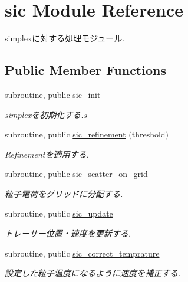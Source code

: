 \hypertarget{classsic}{\section{sic Module Reference}
\label{classsic}
}


simplexに対する処理モジュール.  


\subsection*{Public Member Functions}
\begin{DoxyCompactItemize}
\item 
\hypertarget{classsic_af76384b2a57a47d7b02f3574a5b1a2b9}{subroutine, public \hyperlink{classsic_af76384b2a57a47d7b02f3574a5b1a2b9}{sic\-\_\-init}}\label{classsic_af76384b2a57a47d7b02f3574a5b1a2b9}

\begin{DoxyCompactList}\small\item\em simplexを初期化する.\-s \end{DoxyCompactList}\item 
subroutine, public \hyperlink{classsic_afdb4c8e975017da107618e892a08d2b2}{sic\-\_\-refinement} (threshold)
\begin{DoxyCompactList}\small\item\em Refinementを適用する. \end{DoxyCompactList}\item 
\hypertarget{classsic_a2543398f0de764a44514acd6e4a0a93c}{subroutine, public \hyperlink{classsic_a2543398f0de764a44514acd6e4a0a93c}{sic\-\_\-scatter\-\_\-on\-\_\-grid}}\label{classsic_a2543398f0de764a44514acd6e4a0a93c}

\begin{DoxyCompactList}\small\item\em 粒子電荷をグリッドに分配する. \end{DoxyCompactList}\item 
\hypertarget{classsic_a81b2a4e731ae8e7b6f56d89a0be4c910}{subroutine, public \hyperlink{classsic_a81b2a4e731ae8e7b6f56d89a0be4c910}{sic\-\_\-update}}\label{classsic_a81b2a4e731ae8e7b6f56d89a0be4c910}

\begin{DoxyCompactList}\small\item\em トレーサー位置・速度を更新する. \end{DoxyCompactList}\item 
\hypertarget{classsic_a8d98c7e0c3591ed7b0c8323abfa517f5}{subroutine, public \hyperlink{classsic_a8d98c7e0c3591ed7b0c8323abfa517f5}{sic\-\_\-correct\-\_\-temprature}}\label{classsic_a8d98c7e0c3591ed7b0c8323abfa517f5}

\begin{DoxyCompactList}\small\item\em 設定した粒子温度になるように速度を補正する. \end{DoxyCompactList}\end{DoxyCompactItemize}


